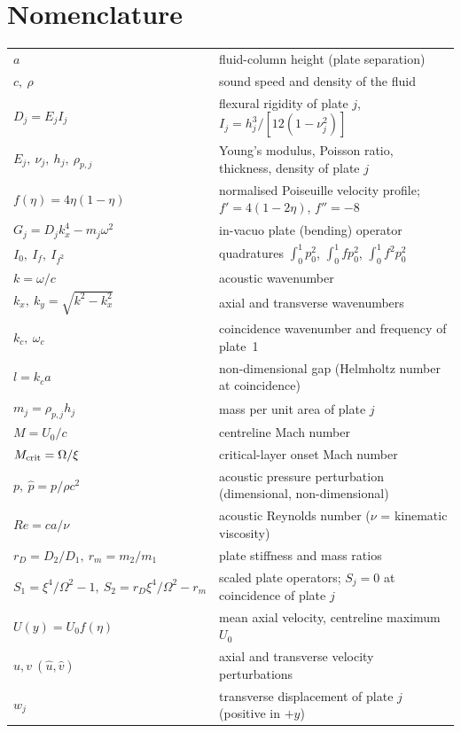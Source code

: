 \documentclass[11pt,a4paper]{article}
\newcommand{\Om}{\Omega}
\newcommand{\Rey}{\mathit{Re}}
\theoremstyle{plain}
\theoremstyle{remark}
\begin{document}
\section*{Nomenclature}
\small\noindent\begin{tabular}{@{}l@{\hspace{1.2em}}p{}@{}}
\toprule
$a$ & fluid-column height (plate separation)\\
$c,\ \rho$ & sound speed and density of the fluid\\
$D_j=E_jI_j$ & flexural rigidity of plate $j$, $I_j=h_j^3/[12(1-\nu_j^2)]$\\
$E_j,\ \nu_j,\ h_j,\ \rho_{p,j}$ & Young's modulus, Poisson ratio, thickness, density of plate $j$\\
$f(\eta)=4\eta(1-\eta)$ & normalised Poiseuille velocity profile; $f'=4(1-2\eta)$, $f''=-8$\\
$G_j=D_jk_x^4-m_j\omega^2$ & in-vacuo plate (bending) operator\\
$I_0,\ I_f,\ I_{f^2}$ & quadratures $\int_0^1p_0^2$, $\int_0^1fp_0^2$, $\int_0^1f^2p_0^2$\\
$k=\omega/c$ & acoustic wavenumber\\
$k_x,\ k_y=\sqrt{k^2-k_x^2}$ & axial and transverse wavenumbers\\
$k_c,\ \omega_c$ & coincidence wavenumber and frequency of plate~1\\
$l=k_ca$ & non-dimensional gap (Helmholtz number at coincidence)\\
$m_j=\rho_{p,j}h_j$ & mass per unit area of plate $j$\\
$M=U_0/c$ & centreline Mach number\\
$M_{\rm crit}=\Om/\xi$ & critical-layer onset Mach number\\
$p,\ \hat p=p/\rho c^2$ & acoustic pressure perturbation (dimensional, non-dimensional)\\
$\Rey=ca/\nu$ & acoustic Reynolds number ($\nu$ = kinematic viscosity)\\
$r_D=D_2/D_1,\ r_m=m_2/m_1$ & plate stiffness and mass ratios\\
$S_1=\xi^4/\Om^2-1,\ S_2=r_D\xi^4/\Om^2-r_m$ & scaled plate operators; $S_j=0$ at coincidence of plate $j$\\
$U(y)=U_0f(\eta)$ & mean axial velocity, centreline maximum $U_0$\\
$u,v\ (\hat u,\hat v)$ & axial and transverse velocity perturbations\\
$w_j$ & transverse displacement of plate $j$ (positive in $+y$)\\

\end{tabular}
\end{document}
